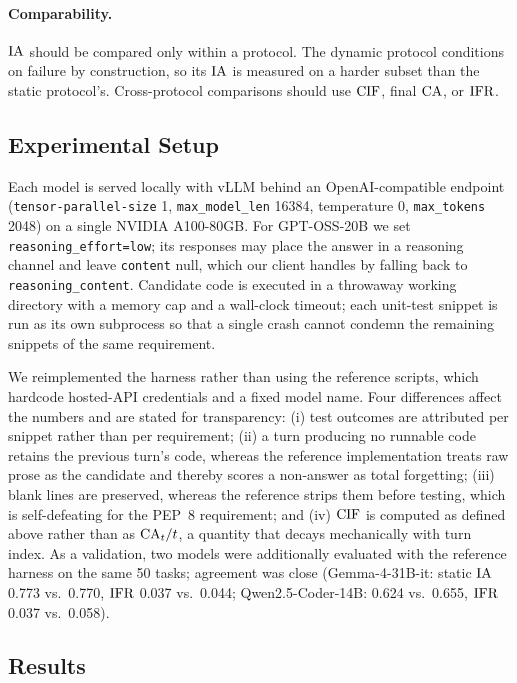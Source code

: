 \paragraph{Comparability.}
$\mathrm{IA}$ should be compared only within a protocol. The dynamic protocol
conditions on failure by construction, so its $\mathrm{IA}$ is measured on a harder
subset than the static protocol's. Cross-protocol comparisons should use
$\mathrm{CIF}$, final $\mathrm{CA}$, or $\mathrm{IFR}$.

\subsection{Experimental Setup}

Each model is served locally with vLLM behind an OpenAI-compatible endpoint
(\texttt{tensor-parallel-size} 1, \texttt{max\_model\_len} 16384, temperature 0,
\texttt{max\_tokens} 2048) on a single NVIDIA A100-80GB. For GPT-OSS-20B we set
\texttt{reasoning\_effort=low}; its responses may place the answer in a
reasoning channel and leave \texttt{content} null, which our client handles by
falling back to \texttt{reasoning\_content}. Candidate code is executed in a
throwaway working directory with a memory cap and a wall-clock timeout; each
unit-test snippet is run as its own subprocess so that a single crash cannot
condemn the remaining snippets of the same requirement.

We reimplemented the harness rather than using the reference scripts, which
hardcode hosted-API credentials and a fixed model name. Four differences affect
the numbers and are stated for transparency: (i) test outcomes are attributed
per snippet rather than per requirement; (ii) a turn producing no runnable code
retains the previous turn's code, whereas the reference implementation treats
raw prose as the candidate and thereby scores a non-answer as total forgetting;
(iii) blank lines are preserved, whereas the reference strips them before
testing, which is self-defeating for the PEP~8 requirement; and (iv) $\mathrm{CIF}$ is
computed as defined above rather than as $\mathrm{CA}_t / t$, a quantity that decays
mechanically with turn index. As a validation, two models were additionally
evaluated with the reference harness on the same 50 tasks; agreement was close
(Gemma-4-31B-it: static $\mathrm{IA}$ 0.773 vs.\ 0.770, $\mathrm{IFR}$ 0.037 vs.\ 0.044;
Qwen2.5-Coder-14B: 0.624 vs.\ 0.655, $\mathrm{IFR}$ 0.037 vs.\ 0.058).

\subsection{Results}

